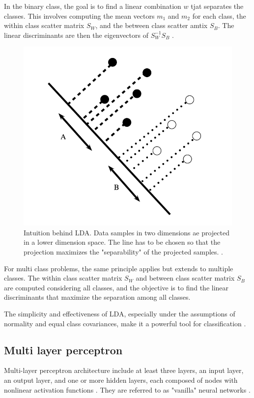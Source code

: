             In the binary class, the goal is to find a linear combination $w$ tjat separates the classes. This involves computing the mean vectors $m_1$ and $m_2$ for each class, the within class scatter matrix $S_W$, and the between class scatter amtix $S_B$. The linear discriminants are then the eigenvectors of $S_W^{-1}S_B$ \cite{xanthopoulos_linear_2013}. 

            \begin{figure}[H]
                \centering
                \includegraphics[width=.6\textwidth]{../src/resources/lda.png}
                \caption{
                    Intuition behind LDA. Data samples in two dimensions ae projected in a lower dimension space. The line has to be chosen so that the projection maximizes the "separability" of the projected samples. \cite{xanthopoulos_linear_2013}.
                }
                \label{fig:linear_discriminant_analysis}
            \end{figure}

            For multi class problems, the same principle applies but extends to multiple classes. The within class scatter matrix $S_W$ and between class scatter matrix $S_B$ are computed considering all classes, and the objective is to find the linear discriminants that maximize the separation among all classes.  

            The simplicity and effectiveness of LDA, especially under the assumptions of normality and equal class covariances, make it a powerful tool for classification \cite{balakrishnama_linear_nodate}.

        \subsection{Multi layer perceptron}
            Multi-layer perceptron architecture include at least three layers, an input layer, an output layer, and one or more hidden layers, each composed of nodes with nonlinear activation functions \cite{svozil_introduction_1997}. They are referred to as "vanilla" neural networks \cite{hastie_elements_2009}.

